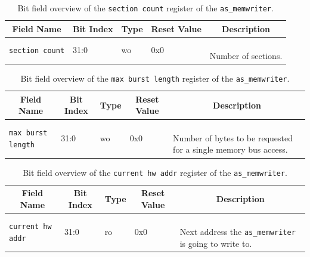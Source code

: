 \begin{longtable}[ht]{|l|l|l|l|l|}
    \hline
    \multicolumn{1}{|c|}{\textbf{Field Name}} & \multicolumn{1}{c|}{\textbf{Bit Index}} & \multicolumn{1}{c|}{\textbf{Type}} & \multicolumn{1}{c|}{\textbf{Reset Value}} & \multicolumn{1}{c|}{\textbf{Description}}\\
    \hline
    
    \texttt{section count} & 31:0 & wo & 0x0 & \parbox{5cm}{\ \\
        Number of sections.\\
    }\\
    \hline
    
    \caption{Bit field overview of the \texttt{section count} register of the \texttt{as\_memwriter}.}
    \label{table:memwriter-section_count-fields}
\end{longtable}


\begin{longtable}[ht]{|l|l|l|l|l|}
    \hline
    \multicolumn{1}{|c|}{\textbf{Field Name}} & \multicolumn{1}{c|}{\textbf{Bit Index}} & \multicolumn{1}{c|}{\textbf{Type}} & \multicolumn{1}{c|}{\textbf{Reset Value}} & \multicolumn{1}{c|}{\textbf{Description}}\\
    \hline
    
    \texttt{max burst length} & 31:0 & wo & 0x0 & \parbox{5cm}{\ \\
        Number of bytes to be requested for a single memory bus access.\\
    }\\
    \hline
    
    \caption{Bit field overview of the \texttt{max burst length} register of the \texttt{as\_memwriter}.}
    \label{table:memwriter-burst-fields}
\end{longtable}


\begin{longtable}[ht]{|l|l|l|l|l|}
    \hline
    \multicolumn{1}{|c|}{\textbf{Field Name}} & \multicolumn{1}{c|}{\textbf{Bit Index}} & \multicolumn{1}{c|}{\textbf{Type}} & \multicolumn{1}{c|}{\textbf{Reset Value}} & \multicolumn{1}{c|}{\textbf{Description}}\\
    \hline
    
    \texttt{current hw addr} & 31:0 & ro & 0x0 & \parbox{5cm}{\ \\
        Next address the \texttt{as\_memwriter} is going to write to.\\
    }\\
    \hline
    
    \caption{Bit field overview of the \texttt{current hw addr} register of the \texttt{as\_memwriter}.}
    \label{table:memwriter-cur_hw-fields}
\end{longtable}


